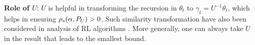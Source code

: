 \textbf{Role of $U$}: $U$ is helpful in transforming the recursion in $\theta_t$ to $\gamma_t=U^{-1}\theta_t$, which helps in ensuring $\rho_s(\alpha,P_U)>0$. Such similarity transformation have also been considered in analysis of RL algorithms \cite{lihong}.
More generally, one can always take $U$ in the result that leads to the smallest bound.\par
\begin{comment}
\textbf{Role of $U$}: When the given problem $P$ is positive definite, it is straightforward to produce an $\alpha_P>0$ such that $\rhos{P}>0$ and $\rhod{P}>0,\,\forall \alpha\in(0,\alpha_P)$ by considering the definitions of $\rhos{P}$ and $\rhod{P}$.
However, the problem $P$ being Hurwitz does not guarantee positive definiteness. %
\todoc{I commented out the examples.}
Following  \cite{lihong}, we remedy this 
by applying a similarity transformation using an appropriate $U$ that transforms a Hurwitz problem $P$ to a positive definite problem $P_U$. This can be done because any Hurwitz matrix is similar to a PD matrix. 
Taking $U$ to be this similarity matrix, we transform  \eqref{conststep} by pre-multiplying it by $U^{-1}$ and introducing a new variable $\gamma_t\eqdef U^{-1 }\theta_t$.
\if0
To see how this works, let $\gamma_t\eqdef U^{-1 }\theta_t$. Pre-multiplying 
 \eqref{conststep} by $U^{-1}$ and plugging in $\gamma_t$, we get
\begin{align*}
\gamma_t&=\gamma_{t-1}+\alpha(U^{-1} b_t- J_t\gamma_{t-1}),
\end{align*}
where $J_t = U^{-1}A_t U$.
Now, since any Hurwitz matrix is similar to a PD matrix with an appropriate similarity transformation $U$, choosing $U$ this way we get that $\E[J_t]$ is PD, hence $P_U$ is PD.
\fi
The condition number $\cond{U}$ appears in our bound because $\theta_t$ is recovered from $\gamma_t$ using
$\theta_t=U\gamma_t$. Of course, when the problem $P$ is positive definite, we can let $U=\I$ in \Cref{th:rate}. 
More generally, one can always take $U$ in the result that leads to the smallest bound.
\end{comment}
